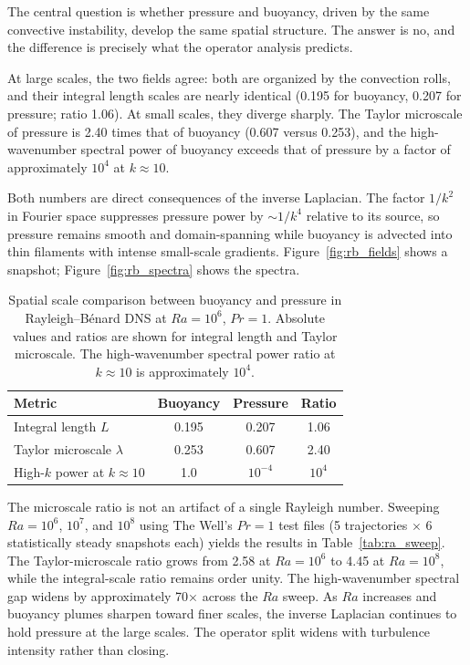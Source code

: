 \documentclass[11pt]{article}
\begin{document}
The central question is whether pressure and buoyancy, driven by the same convective instability, develop the same spatial structure. The answer is no, and the difference is precisely what the operator analysis predicts.

At large scales, the two fields agree: both are organized by the convection rolls, and their integral length scales are nearly identical (0.195 for buoyancy, 0.207 for pressure; ratio 1.06). At small scales, they diverge sharply. The Taylor microscale of pressure is 2.40 times that of buoyancy (0.607 versus 0.253), and the high-wavenumber spectral power of buoyancy exceeds that of pressure by a factor of approximately $10^4$ at $k \approx 10$.

Both numbers are direct consequences of the inverse Laplacian. The factor $1/k^2$ in Fourier space suppresses pressure power by $\sim 1/k^4$ relative to its source, so pressure remains smooth and domain-spanning while buoyancy is advected into thin filaments with intense small-scale gradients. Figure~\ref{fig:rb_fields} shows a snapshot; Figure~\ref{fig:rb_spectra} shows the spectra.

\begin{table}[t]
\centering
\caption{Spatial scale comparison between buoyancy and pressure in Rayleigh--B\'enard DNS at $Ra = 10^6$, $Pr = 1$. Absolute values and ratios are shown for integral length and Taylor microscale. The high-wavenumber spectral power ratio at $k \approx 10$ is approximately $10^4$.}
\label{tab:dns_scales}
\begin{tabular}{lccc}
\toprule
Metric & Buoyancy & Pressure & Ratio \\
\midrule
Integral length $L$ & 0.195 & 0.207 & 1.06 \\
Taylor microscale $\lambda$ & 0.253 & 0.607 & 2.40 \\
High-$k$ power at $k \approx 10$ & 1.0 & $10^{-4}$ & $10^4$ \\
\bottomrule
\end{tabular}
\end{table}

The microscale ratio is not an artifact of a single Rayleigh number. Sweeping $Ra = 10^6$, $10^7$, and $10^8$ using The Well's $Pr = 1$ test files (5 trajectories $\times$ 6 statistically steady snapshots each) yields the results in Table~\ref{tab:ra_sweep}. The Taylor-microscale ratio grows from 2.58 at $Ra = 10^6$ to 4.45 at $Ra = 10^8$, while the integral-scale ratio remains order unity. The high-wavenumber spectral gap widens by approximately 70× across the $Ra$ sweep. As $Ra$ increases and buoyancy plumes sharpen toward finer scales, the inverse Laplacian continues to hold pressure at the large scales. The operator split widens with turbulence intensity rather than closing.
\end{document}
